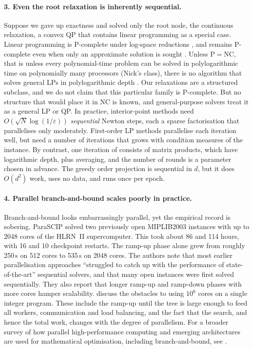 \paragraph{3. Even the root relaxation is inherently sequential.}
Suppose we gave up exactness and solved only the root node, the continuous relaxation, a
convex QP that contains linear programming as a special case. Linear programming is
P-complete under log-space reductions \citep{dobkin1979lp}, and remains P-complete even when
only an approximate solution is sought \citep{serna1991approximating}. Unless
$\mathrm{P}=\mathrm{NC}$, that is unless every polynomial-time problem can be solved in
polylogarithmic time on polynomially many processors (Nick's class), there is no algorithm
that solves general LPs in polylogarithmic depth \citep{greenlaw1995limits}. Our
relaxations are a structured subclass, and we do not claim that this particular family is
P-complete. But no structure that would place it in NC is known, and general-purpose
solvers treat it as a general LP or QP. In practice, interior-point methods need
$O(\sqrt{N}\log(1/\varepsilon))$ \emph{sequential} Newton steps, each a sparse factorisation
that parallelises only moderately. First-order LP methods \citep{applegate2021pdlp}
parallelise each iteration well, but need a number of iterations that grows with condition
measures of the instance. By contrast, one iteration of \feddbn{} consists of matrix products,
which have logarithmic depth, plus averaging, and the number of rounds is a parameter chosen
in advance. The greedy order projection is sequential in $d$, but it does $O(d^2)$ work, uses
no data, and runs once per epoch.

\paragraph{4. Parallel branch-and-bound scales poorly in practice.}
Branch-and-bound looks embarrassingly parallel, yet the empirical record is sobering.
ParaSCIP \citep{shinano2010parascip} solved two previously open MIPLIB2003 instances with up
to 2048 cores of the HLRN~II supercomputer. This took about 86 and 114 hours, with 16 and 10
checkpoint restarts. The ramp-up phase alone grew from roughly 250\,s on 512 cores to 535\,s
on 2048 cores. The authors note that most earlier parallelisation approaches ``struggled to
catch up with the performance of state-of-the-art'' sequential solvers, and that many open
instances were first solved sequentially. They also report that longer ramp-up and ramp-down
phases with more cores hamper scalability. \citet{koch2012million} discuss the
obstacles to using $10^6$ cores on a single integer program. These include the ramp-up until
the tree is large enough to feed all workers, communication and load balancing, and the fact
that the search, and hence the total work, changes with the degree of parallelism. For a
broader survey of how parallel high-performance computing and emerging architectures are
used for mathematical optimisation, including branch-and-bound, see
\citet{bernalneira2024survey}.


